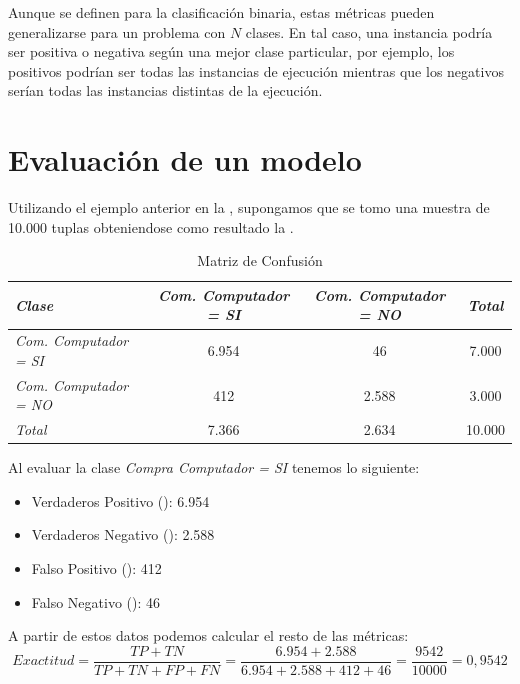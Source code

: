 Aunque se definen para la clasificación binaria, estas métricas pueden generalizarse para un problema con $N$ clases. En tal caso, una instancia podría ser positiva o negativa según una mejor clase particular, por ejemplo, los positivos podrían ser todas las instancias de ejecución mientras que los negativos serían todas las instancias distintas de la ejecución.

\section{Evaluación de un modelo}

Utilizando el ejemplo anterior en la , supongamos que se tomo una muestra de 10.000 tuplas obteniendose como resultado la .


\begin{table}[htbp]
	\caption{Matriz de Confusión}
	\label{tabla:MatrizConfusion}
	\begin{tabular}{|l|c|c|c|}
		\hline 
		\textit{Clase} & \textit{Com. Computador = SI}    &\textit{Com. Computador = NO} & \textit{Total}  \\
		\hline 
		\textit{Com. Computador = SI}	& 6.954   	& 46    	& 7.000     \\ 
		\hline 
		\textit{Com. Computador = NO}	& 412		& 2.588		& 3.000    	\\ 
		\hline
		\textit{Total}					& 7.366		& 2.634    	& 10.000	\\ 
		\hline
	\end{tabular}
\end{table}


Al evaluar la clase \textit{Compra Computador = SI} tenemos lo siguiente:

\begin{itemize}
	\item Verdaderos Positivo (): 6.954
	\item Verdaderos Negativo (): 2.588
	\item Falso Positivo (): 412
	\item Falso Negativo (): 46
\end{itemize}

A partir de estos datos podemos calcular el resto de las métricas:
\begin{equation*}
Exactitud = \frac{TP + TN}{TP + TN + FP + FN} = \frac{6.954 + 2.588}{6.954 + 2.588 + 412 + 46} = \frac{9542}{10000} = 0,9542
\end{equation*}

